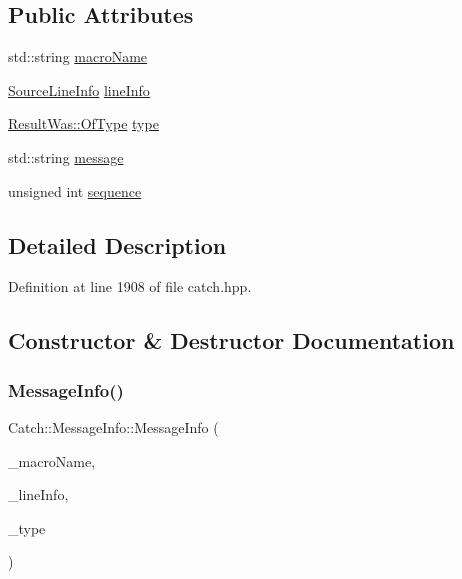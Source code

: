\subsection*{Public Attributes}
\begin{DoxyCompactItemize}
\item 
std\+::string \hyperlink{struct_catch_1_1_message_info_a156ade4b3cc731f6ec7b542ae47ba8e3}{macro\+Name}
\item 
\hyperlink{struct_catch_1_1_source_line_info}{Source\+Line\+Info} \hyperlink{struct_catch_1_1_message_info_a985165328723e599696ebd8e43195cc5}{line\+Info}
\item 
\hyperlink{struct_catch_1_1_result_was_a624e1ee3661fcf6094ceef1f654601ef}{Result\+Was\+::\+Of\+Type} \hyperlink{struct_catch_1_1_message_info_ae928b9117465c696e45951d9d0284e78}{type}
\item 
std\+::string \hyperlink{struct_catch_1_1_message_info_ab6cd06e050bf426c6577502a5c50e256}{message}
\item 
unsigned int \hyperlink{struct_catch_1_1_message_info_a7f4f57ea21e50160adefce7b68a781d6}{sequence}
\end{DoxyCompactItemize}


\subsection{Detailed Description}


Definition at line 1908 of file catch.\+hpp.



\subsection{Constructor \& Destructor Documentation}
\hypertarget{struct_catch_1_1_message_info_a2e336c33ebef7af3c1bbae6a56e14f8a}{}\label{struct_catch_1_1_message_info_a2e336c33ebef7af3c1bbae6a56e14f8a} 
\subsubsection{\texorpdfstring{Message\+Info()}{MessageInfo()}}
{\footnotesize\ttfamily Catch\+::\+Message\+Info\+::\+Message\+Info (\begin{DoxyParamCaption}\item[{std\+::string const \&}]{\+\_\+macro\+Name,  }\item[{\hyperlink{struct_catch_1_1_source_line_info}{Source\+Line\+Info} const \&}]{\+\_\+line\+Info,  }\item[{\hyperlink{struct_catch_1_1_result_was_a624e1ee3661fcf6094ceef1f654601ef}{Result\+Was\+::\+Of\+Type}}]{\+\_\+type }\end{DoxyParamCaption})}



